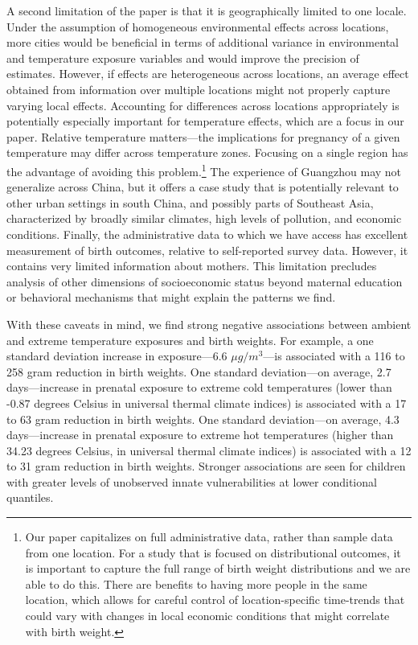 A second limitation of the paper is that it is geographically limited to one locale. Under the assumption of homogeneous environmental effects across locations, more cities would be beneficial in terms of additional variance in environmental and temperature exposure variables and would improve the precision of estimates. However, if effects are heterogeneous across locations, an average effect obtained from information over multiple locations might not properly capture varying local effects. Accounting for differences across locations appropriately is potentially especially important for temperature effects, which are a focus in our paper. Relative temperature matters---the implications for pregnancy of a given temperature may differ across temperature zones.  Focusing on a single region has the advantage of avoiding this problem.\footnote{Our paper capitalizes on full administrative data, rather than sample data from one location. For a study that is focused on distributional outcomes, it is important to capture the full range of birth weight distributions and we are able to do this.  There are benefits to having more people in the same location, which allows for careful control of location-specific time-trends that could vary with changes in local economic conditions that might correlate with birth weight.} The experience of Guangzhou may not generalize across China, but it offers a case study that is potentially relevant to other urban settings in south China, and possibly parts of Southeast Asia, characterized by broadly similar climates, high levels of pollution, and economic conditions. Finally, the administrative data to which we have access has excellent measurement of birth outcomes, relative to self-reported survey data.  However, it contains very limited information about mothers. This limitation precludes analysis of other dimensions of socioeconomic status beyond maternal education or behavioral mechanisms that might explain the patterns we find.  


With these caveats in mind, we find strong negative associations between ambient \PARPMTEN and extreme
temperature exposures and birth weights. For example, a one standard
deviation increase in \PARPMTEN exposure---6.6 $\mu g/m^3$---is
associated with a 116 to 258 gram reduction in birth weights. One
standard deviation---on average, 2.7 days---increase in prenatal exposure
to extreme cold temperatures (lower than -0.87 degrees Celsius in universal
thermal climate indices) is associated with a 17 to 63 gram reduction in
birth weights. One standard deviation---on average, 4.3
days---increase in prenatal exposure to extreme hot temperatures (higher
than 34.23 degrees Celsius, in universal thermal climate indices) is associated
with a 12 to 31 gram reduction in birth weights. Stronger associations are
seen for children with greater levels of unobserved innate vulnerabilities at lower conditional quantiles.

